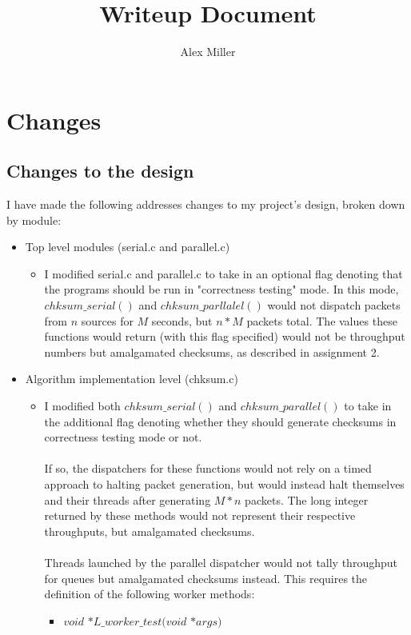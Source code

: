 \documentclass[]{article}
\title{Writeup Document}
\author{Alex Miller}
\begin{document}
\maketitle

\section{Changes}
\subsection{Changes to the design}
I have made the following addresses changes to my project's design, broken down by module:
\begin{itemize}
	\item Top level modules (serial.c and parallel.c)
	\begin{itemize}
		\item I modified serial.c and parallel.c to take in an optional flag denoting that the programs should be run in "correctness testing" mode. In this mode, $chksum\_serial()$ and $chksum\_parllalel()$ would not dispatch packets from $n$ sources for $M$ seconds, but $n * M$ packets total. The values these functions would return (with this flag specified) would not be throughput numbers but amalgamated checksums, as described in assignment 2.
	\end{itemize}
	\item Algorithm implementation level (chksum.c)
	\begin{itemize}
		\item I modified both  $chksum\_serial()$ and $chksum\_parallel()$ to take in the additional flag denoting whether they should generate checksums in correctness testing mode or not.
		\\\\
		If so, the dispatchers for these functions would not rely on a timed approach to halting packet generation, but would instead halt themselves and their threads after generating $M * n$ packets. The long integer returned by these methods would not represent their respective throughputs, but amalgamated checksums.
		\\\\
		Threads launched by the parallel dispatcher would not tally throughput for queues but amalgamated checksums instead. This requires the definition of the following worker methods:
		\begin{itemize}
			\item $void$ $*L\_worker\_test(void$ $*args)$

\end{itemize}
\end{itemize}
\end{itemize}
\end{document}
